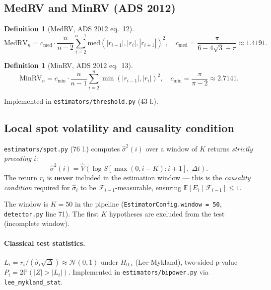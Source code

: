 \documentclass[11pt,a4paper]{article}
\theoremstyle{plain}
\theoremstyle{definition}
\newtheorem{definition}[theorem]{Definition}
\theoremstyle{remark}
\newcommand{\E}{\mathbb{E}}
\newcommand{\Prob}{\mathbb{P}}
\newcommand{\dt}{\Delta}
\begin{document}
\subsection{MedRV and MinRV (ADS 2012)}

\begin{definition}[MedRV, ADS 2012 eq.~12]
\begin{equation}\label{eq:medrv}
  \mathrm{MedRV}_n = c_\mathrm{med} \cdot \frac{n}{n-2}
    \sum_{i=2}^{n-1} \mathrm{med}(|r_{i-1}|, |r_i|, |r_{i+1}|)^2,
  \quad c_\mathrm{med} = \frac{\pi}{6 - 4\sqrt{3} + \pi} \approx 1.4191.
\end{equation}
\end{definition}

\begin{definition}[MinRV, ADS 2012 eq.~13]
\begin{equation}\label{eq:minrv}
  \mathrm{MinRV}_n = c_\mathrm{min} \cdot \frac{n}{n-1}
    \sum_{i=2}^{n} \min(|r_{i-1}|, |r_i|)^2,
  \quad c_\mathrm{min} = \frac{\pi}{\pi - 2} \approx 2.7141.
\end{equation}
\end{definition}

Implemented in \texttt{estimators/threshold.py} (43 l.).

\subsection{Local spot volatility and causality condition}
\label{sec:spot}

\texttt{estimators/spot.py} (76 l.) computes $\hat{\sigma}^2(i)$ over a
window of $K$ returns \emph{strictly preceding} $i$:
\begin{equation}\label{eq:window}
  \hat{\sigma}^2(i) = \hat{V}(\log S[\max(0, i-K) : i+1],\; \dt t).
\end{equation}
The return $r_i$ is \textbf{never} included in the estimation window --- this
is the \emph{causality condition} required for $\hat{\sigma}_i$ to be
$\mathcal{F}_{i-1}$-measurable, ensuring $\E[E_i \mid \mathcal{F}_{i-1}] \le 1$.

The window is $K = 50$ in the pipeline (\texttt{EstimatorConfig.window = 50},
\texttt{detector.py} line 71). The first $K$ hypotheses are excluded from
the test (incomplete window).


\paragraph{Classical test statistics.}
$L_i = r_i / (\hat{\sigma}_i\sqrt{\dt}) \approx \mathcal{N}(0,1)$ under
$H_{0,i}$ (Lee-Mykland), two-sided p-value $P_i = 2\Prob(|Z| > |L_i|)$.
Implemented in \texttt{estimators/bipower.py} via
\texttt{lee\_mykland\_stat}.
\end{document}
